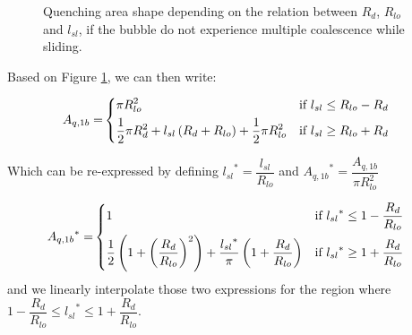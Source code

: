 \begin{figure}[!h]
\centering
{}
\hfill
{}
\hfill
{}
\caption{Quenching area shape depending on the relation between $R_{d}$, $R_{lo}$ and $l_{sl}$, if the bubble do not experience multiple coalescence while sliding. }
\label{fig:slide_area}
\end{figure}

\npar

Based on Figure \ref{fig:slide_area}, we can then write:

\begin{align}
A_{q,1b} = &
\begin{dcases}
\pi R_{lo}^{2} & \text{if } l_{sl}\leq R_{lo}-R_{d} \\
%
\frac{1}{2}\pi R_{d}^{2} + l_{sl}\parth{R_{d}+R_{lo}} + \frac{1}{2}\pi R_{lo}^{2} & \text{if } l_{sl} \geq R_{lo}+R_{d}
%
\end{dcases}
\label{eq:Aq_1b}
\end{align}

Which can be re-expressed by defining ${l_{sl}}^{*}=\dfrac{l_{sl}}{R_{lo}}$ and ${A_{q,1b}}^{*}=\dfrac{A_{q,1b}}{\pi R_{lo}^{2}}$

\begin{align}
{A_{q,1b}}^{*} = &
\begin{dcases}
1 & \text{if } {l_{sl}}^{*}\leq 1- \frac{R_{d}}{R_{lo}} \\
%
\frac{1}{2}\parth{1+\parth{\frac{R_{d}}{R_{lo}}}^{2} } + \frac{{l_{sl}}^{*}}{\pi}\parth{1+\frac{R_{d}}{R_{lo}}} & \text{if } {l_{sl}}^{*} \geq 1 + \frac{R_{d}}{R_{lo}}
\end{dcases}
\label{eq:Aq_1b_star}
\end{align}
and we linearly interpolate those two expressions for the region where $1-\dfrac{R_{d}}{R_{lo}}\leq {l_{sl}}^{*} \leq 1+\dfrac{R_{d}}{R_{lo}}$.


